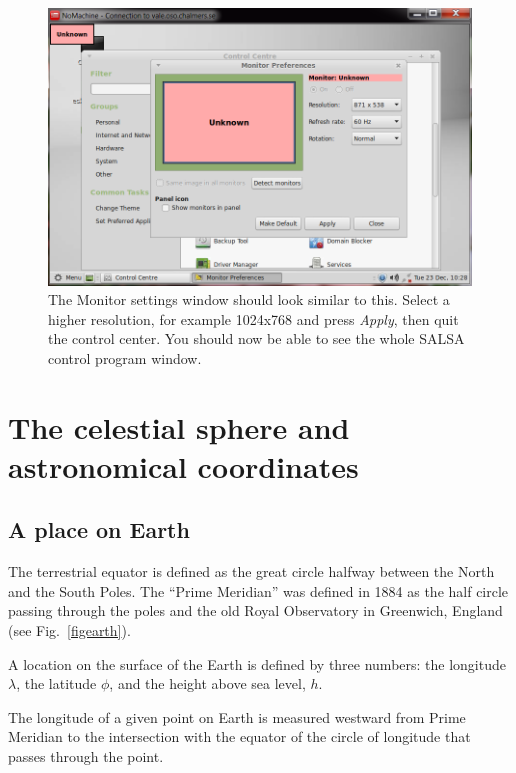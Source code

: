 \begin{figure}[H]
    \centering
    \includegraphics[height=0.3\paperheight]{../figures/nomachinefigs/fig11_monitors.png}
	\caption{The Monitor settings window should look similar to this. Select a
	higher resolution, for example 1024x768 and press \emph{Apply}, then quit
the control center. You should now be able to see the whole SALSA control
program window.}
    \label{fig:monitors}
\end{figure}



\chapter{The celestial sphere and astronomical coordinates}
\label{app:coord}

\section{A place on Earth}

The terrestrial equator is defined as the great circle halfway between
the North and the South Poles.  The ``Prime Meridian'' was defined in
1884 as the half circle passing through the poles and the old Royal
Observatory in Greenwich, England (see Fig.~\ref{figearth}).

A location on the surface of the Earth is defined by three numbers:
the longitude $\lambda$, the latitude $\phi$, and the height above sea
level, $h$.

The longitude of a given point on Earth is measured westward from
Prime Meridian to the intersection with the equator of the circle of
longitude that passes through the point.


